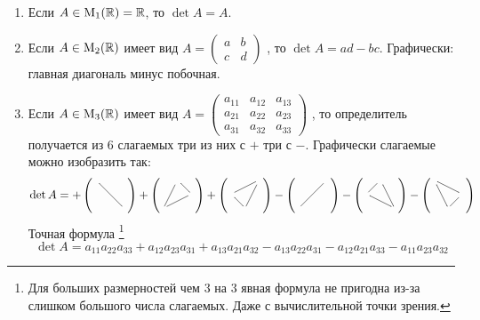\begin{enumerate}
\item Если $A\in \operatorname{M}_{1}(\mathbb R) = \mathbb R$, то $\det A = A$.

\item Если $A \in \operatorname{M}_{2}(\mathbb R)$ имеет вид 
$
A = \left(\begin{smallmatrix}{a}&{b}\\{c}&{d}\end{smallmatrix}\right)
$
, то $\det A = ad - bc$.
Графически: главная диагональ минус побочная.

\item Если $A\in \operatorname{M}_{3}(\mathbb R)$ имеет вид
$
A = \left(\begin{smallmatrix}{a_{11}}&{a_{12}}&{a_{13}}\\{a_{21}}&{a_{22}}&{a_{23}}\\{a_{31}}&{a_{32}}&{a_{33}}\end{smallmatrix}\right)
$
, то определитель получается из $6$ слагаемых три из них с $+$ три с $-$.
Графически слагаемые можно изобразить так:
\[
\det A = 
+
\left(
\parbox{6pt}{
\xymatrix@R=6pt@C=6pt{
	{}\ar@{-}[ddrr]&{}&{}\\
	{}&{}&{}\\
	{}&{}&{}\\
}}
\right) +
\left(
\parbox{6pt}{
\xymatrix@R=6pt@C=6pt{
	{}&{}\ar@{-}[dr]&{}\\
	{}&{}&{}\ar@{-}[dll]\\
	{}\ar@{-}[uur]&{}&{}\\
}}
\right) +
\left(
\parbox{6pt}{
\xymatrix@R=6pt@C=6pt{
	{}&{}&{}\ar@{-}[ddl]\\
	{}\ar@{-}[urr]&{}&{}\\
	{}&{}\ar@{-}[ul]&{}\\
}}
\right) -
\left(
\parbox{6pt}{
\xymatrix@R=6pt@C=6pt{
	{}&{}&{}\ar@{-}[ddll]\\
	{}&{}&{}\\
	{}&{}&{}\\
}}
\right) -
\left(
\parbox{6pt}{
\xymatrix@R=6pt@C=6pt{
	{}&{}\ar@{-}[ddr]&{}\\
	{}\ar@{-}[ur]&{}&{}\\
	{}&{}&{}\ar@{-}[ull]\\
}}
\right) -
\left(
\parbox{6pt}{
\xymatrix@R=6pt@C=6pt{
	{}\ar@{-}[drr]&{}&{}\\
	{}&{}&{}\ar@{-}[dl]\\
	{}&{}\ar@{-}[uul]&{}\\
}}
\right) 
\]
Точная формула%
\footnote{Для больших размерностей чем $3$ на $3$ явная формула не пригодна из-за слишком большого числа слагаемых.
Даже с вычислительной точки зрения.}
\[
\det A = a_{11}a_{22}a_{33} + a_{12}a_{23}a_{31} + a_{13}a_{21}a_{32} - 
a_{13}a_{22}a_{31} - a_{12}a_{21}a_{33} - a_{11}a_{23}a_{32}
\]
\end{enumerate}

